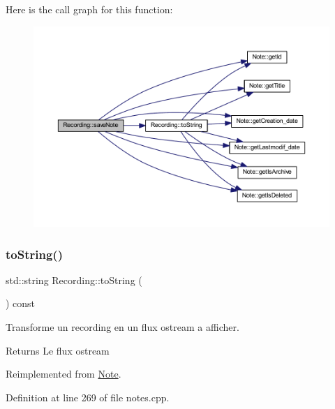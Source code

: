 Here is the call graph for this function\+:\nopagebreak
\begin{figure}[H]
\begin{center}
\leavevmode
\includegraphics[width=350pt]{class_recording_a99e10c8a8c13bce5f70195b6c30a1cc9_cgraph}
\end{center}
\end{figure}
\mbox{\label{class_recording_a9f403a39bec2db40c9171a6c3a20942d}} 
\subsubsection{\texorpdfstring{to\+String()}{toString()}}
{\footnotesize\ttfamily std\+::string Recording\+::to\+String (\begin{DoxyParamCaption}{ }\end{DoxyParamCaption}) const\hspace{0.3cm}{\ttfamily [virtual]}}



Transforme un recording en un flux ostream a afficher. 

\begin{DoxyReturn}{Returns}
Le flux ostream 
\end{DoxyReturn}


Reimplemented from \hyperlink{class_note_a1bd4acfbde0b71d05fd7d4ca889bca2b}{Note}.



Definition at line 269 of file notes.\+cpp.


